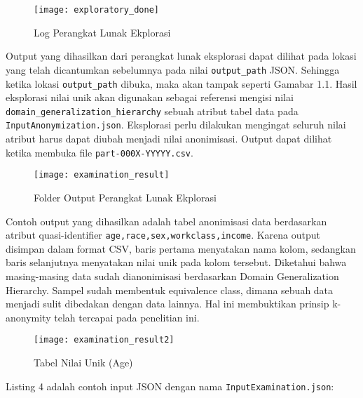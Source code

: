 \begin{figure}[H]
	\centering
	\texttt{[image: exploratory\_done]}
	\caption{Log Perangkat Lunak Ekplorasi}
	\label{fig:pertama2}
\end{figure}

Output yang dihasilkan dari perangkat lunak eksplorasi dapat dilihat pada lokasi yang telah dicantumkan sebelumnya pada nilai \texttt{output\_path} JSON.  Sehingga ketika lokasi \texttt{output\_path} dibuka, maka akan tampak seperti Gamabar 1.1. Hasil eksplorasi nilai unik akan digunakan sebagai referensi mengisi nilai \texttt{domain\_generalization\_hierarchy} sebuah atribut tabel data pada \texttt{InputAnonymization.json}. Eksplorasi perlu dilakukan mengingat seluruh nilai atribut harus dapat diubah menjadi nilai anonimisasi. Output dapat dilihat ketika membuka file \texttt{part-000X-YYYYY.csv}.

\begin{figure}[H]
	\centering
	\texttt{[image: examination\_result]}
	\caption{Folder Output Perangkat Lunak Ekplorasi}
	\label{fig:pertama2}
\end{figure}

Contoh output yang dihasilkan adalah tabel anonimisasi data berdasarkan atribut quasi-identifier \texttt{age,race,sex,workclass,income}. Karena output disimpan dalam format CSV, baris pertama menyatakan nama kolom, sedangkan baris selanjutnya menyatakan nilai unik pada kolom tersebut. Diketahui bahwa masing-masing data sudah dianonimisasi berdasarkan Domain Generalization Hierarchy. Sampel sudah membentuk equivalence class, dimana sebuah data menjadi sulit dibedakan dengan data lainnya. Hal ini membuktikan prinsip k-anonymity telah tercapai pada penelitian ini.

\begin{figure}[H]
	\centering
	\texttt{[image: examination\_result2]}
	\caption{Tabel Nilai Unik (Age)}
	\label{fig:pertama2}
\end{figure}

\noindent Listing 4 adalah contoh input JSON dengan nama \texttt{InputExamination.json}:

